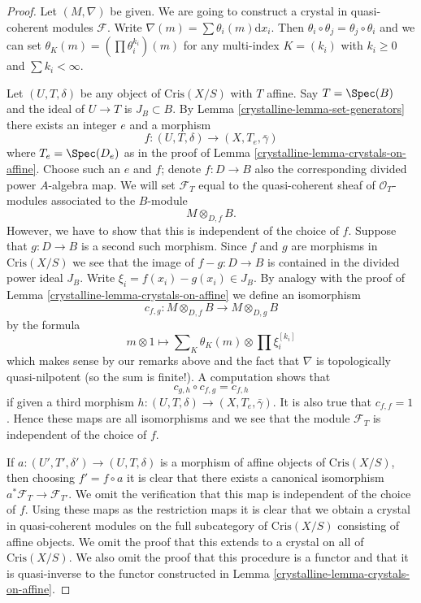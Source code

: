 \begin{proof}

Let $(M, \nabla)$ be given. We are going to construct
a crystal in quasi-coherent modules $\mathcal{F}$.
Write $\nabla(m) = \sum \theta_i(m)\text{d}x_i$.
Then $\theta_i \circ \theta_j = \theta_j \circ \theta_i$ and we
can set $\theta_K(m) = (\prod \theta_i^{k_i})(m)$ for any multi-index
$K = (k_i)$ with $k_i \geq 0$ and $\sum k_i < \infty$.

\medskip\noindent
Let $(U, T, \delta)$ be any object of $\text{Cris}(X/S)$ with $T$ affine.
Say $T = \Spec(B)$ and the ideal of $U \to T$ is $J_B \subset B$.
By Lemma \ref{crystalline-lemma-set-generators} there exists an integer $e$ and a morphism
$$
f : (U, T, \delta) \longrightarrow (X, T_e, \bar\gamma)
$$
where $T_e = \Spec(D_e)$ as in the proof of
Lemma \ref{crystalline-lemma-crystals-on-affine}.
Choose such an $e$ and $f$; denote $f : D \to B$ also the corresponding
divided power $A$-algebra map. We will set $\mathcal{F}_T$ equal to the
quasi-coherent sheaf of $\mathcal{O}_T$-modules associated to the $B$-module
$$
M \otimes_{D, f} B.
$$
However, we have to show that this is independent of the choice of $f$.
Suppose that $g : D \to B$ is a second such morphism. Since $f$ and $g$
are morphisms in $\text{Cris}(X/S)$ we see that the image of
$f - g : D \to B$ is contained in the divided power ideal $J_B$.
Write $\xi_i = f(x_i) - g(x_i) \in J_B$. By analogy with the proof
of Lemma \ref{crystalline-lemma-crystals-on-affine} we define an isomorphism
$$
c_{f, g} : M \otimes_{D, f} B \longrightarrow M \otimes_{D, g} B
$$
by the formula
$$
m \otimes 1 \longmapsto
\sum\nolimits_K \theta_K(m) \otimes \prod \xi_i^{[k_i]}
$$
which makes sense by our remarks above and the fact that $\nabla$
is topologically quasi-nilpotent (so the sum is finite!).
A computation shows that
$$
c_{g, h} \circ c_{f, g} = c_{f, h}
$$
if given a third morphism
$h : (U, T, \delta) \longrightarrow (X, T_e, \bar\gamma)$.
It is also true that $c_{f, f} = 1$.
Hence these maps are all isomorphisms and we see that
the module $\mathcal{F}_T$ is independent of the choice of $f$.

\medskip\noindent
If $a : (U', T', \delta') \to (U, T, \delta)$ is a morphism of affine objects
of $\text{Cris}(X/S)$, then choosing $f' = f \circ a$ it is clear
that there exists a canonical isomorphism
$a^*\mathcal{F}_T \to \mathcal{F}_{T'}$. We omit the verification that this
map is independent of the choice of $f$. Using these maps as the restriction
maps it is clear that we obtain a crystal in quasi-coherent modules
on the full subcategory of $\text{Cris}(X/S)$ consisting of affine objects.
We omit the proof that this extends to a crystal on all of
$\text{Cris}(X/S)$. We also omit the proof that this procedure is a functor
and that it is quasi-inverse to the functor constructed in
Lemma \ref{crystalline-lemma-crystals-on-affine}.
\end{proof}

